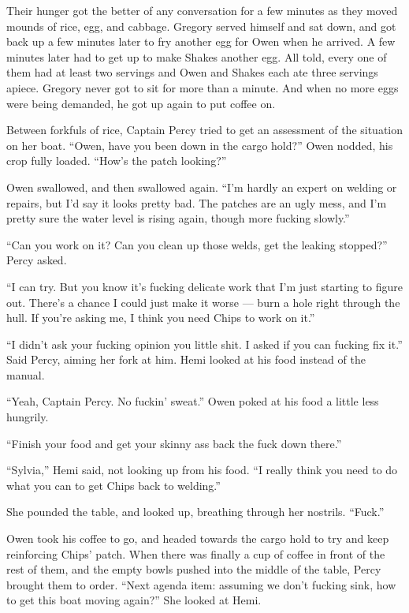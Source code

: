 \documentclass[]{scrbook}
\begin{document}
Their hunger got the better of any conversation for a few minutes as
they moved mounds of rice, egg, and cabbage. Gregory served himself and
sat down, and got back up a few minutes later to fry another egg for
Owen when he arrived. A few minutes later had to get up to make Shakes
another egg. All told, every one of them had at least two servings and
Owen and Shakes each ate three servings apiece. Gregory never got to sit
for more than a minute. And when no more eggs were being demanded, he
got up again to put coffee on.

Between forkfuls of rice, Captain Percy tried to get an assessment of
the situation on her boat. ``Owen, have you been down in the cargo
hold?'' Owen nodded, his crop fully loaded. ``How's the patch looking?''

Owen swallowed, and then swallowed again. ``I'm hardly an expert on
welding or repairs, but I'd say it looks pretty bad. The patches are an
ugly mess, and I'm pretty sure the water level is rising again, though
more fucking slowly.''

``Can you work on it? Can you clean up those welds, get the leaking
stopped?'' Percy asked.

``I can try. But you know it's fucking delicate work that I'm just
starting to figure out. There's a chance I could just make it worse ---
burn a hole right through the hull. If you're asking me, I think you
need Chips to work on it.''

``I didn't ask your fucking opinion you little shit. I asked if you can
fucking fix it.'' Said Percy, aiming her fork at him. Hemi looked at his
food instead of the manual.

``Yeah, Captain Percy. No fuckin' sweat.'' Owen poked at his food a
little less hungrily.

``Finish your food and get your skinny ass back the fuck down there.''

``Sylvia,'' Hemi said, not looking up from his food. ``I really think
you need to do what you can to get Chips back to welding.''

She pounded the table, and looked up, breathing through her nostrils.
``Fuck.''

Owen took his coffee to go, and headed towards the cargo hold to try and
keep reinforcing Chips' patch. When there was finally a cup of coffee in
front of the rest of them, and the empty bowls pushed into the middle of
the table, Percy brought them to order. ``Next agenda item: assuming we
don't fucking sink, how to get this boat moving again?'' She looked at
Hemi.
\end{document}
